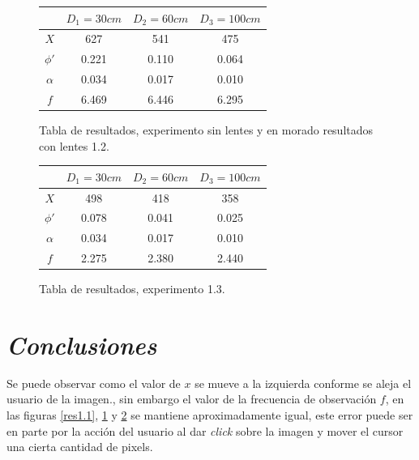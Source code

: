 \documentclass[conference]{IEEEtran}
\begin{document}
\begin{figure}[htbp]
\centering

\begin{tabular}{c|c|c|c|}
	 & $D_1=30cm$ & $D_2=60cm$ & $D_3=100 cm$\\
	\hline
	$X$ & 627 & 541 & 475\\
	\hline
	$\phi'$ & 0.221 & 0.110 & 0.064\\
	\hline
	$\alpha$ & 0.034 & 0.017 & 0.010\\
	\hline
	$f$ & 6.469 & 6.446 & 6.295\\
	\hline
\end{tabular}
\caption{Tabla de resultados, experimento sin lentes y en morado resultados con lentes 1.2.}
\label{res1.2}
\end{figure}

\begin{figure}[htbp]
\centering

\begin{tabular}{c|c|c|c|}
	 & $D_1=30cm$ & $D_2=60cm$ & $D_3=100 cm$\\
	\hline
	$X$ & 498 & 418 & 358\\
	\hline
	$\phi'$ & 0.078 & 0.041 & 0.025\\
	\hline
	$\alpha$ & 0.034 & 0.017 & 0.010\\
	\hline
	$f$ & 2.275 & 2.380 & 2.440\\
	\hline

\end{tabular}

\caption{Tabla de resultados, experimento 1.3.}
\label{res1.3}
\end{figure}



\section{\textit{Conclusiones}}

Se puede observar como el valor de $x$ se mueve a la izquierda conforme se aleja el usuario de la imagen., sin embargo el valor de la frecuencia de observación $f$, en las figuras \ref{res1.1}, \ref{res1.2} y \ref{res1.3} se mantiene aproximadamente igual, este error puede ser en parte por la acción del usuario al dar \textit{click} sobre la imagen y mover el cursor una cierta cantidad de pixels.
\end{document}
